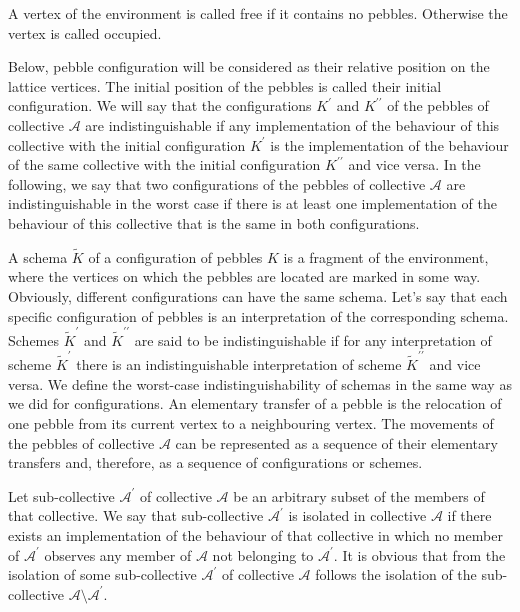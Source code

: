 \documentclass{article}
\begin{document}
A vertex of the environment is called free if it contains no pebbles. 
Otherwise the vertex is called occupied.

Below, pebble configuration will be considered as their relative position on the lattice vertices.
The initial position of the pebbles is called their initial configuration.
We will say that the configurations $K^{\prime}$ and $K^{\prime\prime}$ of the pebbles of collective $\mathcal{A}$ are indistinguishable if any implementation of the behaviour of this collective with the initial configuration $K^{\prime}$ is the implementation of the behaviour of the same collective with the initial configuration $K^{\prime\prime}$ and vice versa.
In the following, we say that two configurations of the pebbles of collective $\mathcal{A}$ are indistinguishable in the worst case if there is at least one implementation of the behaviour of this collective that is the same in both configurations.

A schema $\widetilde K$ of a configuration of pebbles $K$ is a fragment of the environment, where the vertices on which the pebbles are located are marked in some way. 
Obviously, different configurations can have the same schema.
Let's say that each specific configuration of pebbles is an interpretation of the corresponding schema.
Schemes $\widetilde K^{\prime}$ and $\widetilde K^{\prime\prime}$ are said to be indistinguishable if for any interpretation of scheme $\widetilde K^{\prime}$ there is an indistinguishable interpretation of scheme $\widetilde K^{\prime\prime}$ and vice versa. 
We define the worst-case indistinguishability of schemas in the same way as we did for configurations.
An elementary transfer of a pebble is the relocation of one pebble from its current vertex to a neighbouring vertex. 
The movements of the pebbles of collective $\mathcal{A}$ can be represented as a sequence of their elementary transfers and, therefore, as a sequence of configurations or schemes.

Let sub-collective $\mathcal{A}^{\prime}$ of collective $\mathcal{A}$ be an arbitrary subset of the members of that collective.
We say that sub-collective $\mathcal{A}^{\prime}$ is isolated in collective $\mathcal{A}$ if there exists an implementation of the behaviour of that collective in which no member of $\mathcal{A}^{\prime}$ observes any member of $\mathcal{A}$ not belonging to $\mathcal{A}^{\prime}$.
It is obvious that from the isolation of some sub-collective $\mathcal{A}^{\prime}$ of collective $\mathcal{A}$ follows the isolation of the sub-collective $\mathcal{A} \setminus \mathcal{A}^{\prime}$.
\end{document}
